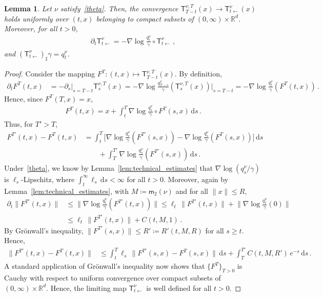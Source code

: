 \documentclass[12pt]{article}
\newcommand{\RR}{\mathbb{R}}
\newcommand{\R}{\RR}
\newcommand{\1}{\mathds{1}}
\newcommand*{\rd}{\mathrm{d}}
\newcommand*{\dd}{\, \rd}
\newcommand{\deq}{\coloneqq}
\renewcommand{\ge}{\geqslant}
\renewcommand{\le}{\leqslant}
\newcommand{\KM}{\mathsf T}
\newcommand{\mom}{\mathsf m_2}
\theoremstyle{plain}
\newtheorem{lemma}[theorem]{Lemma}
\theoremstyle{definition}
\theoremstyle{remark}
\begin{document}
\begin{lemma}\label{lem:km_regular_case}
    Let $\nu$ satisfy~\eqref{theta}.
    Then, the convergence $\KM^{\nu,T}_{T-t}(x) \to \KM^\nu_{t\gets}(x)$ holds uniformly over $(t,x)$ belonging to compact subsets of $(0,\infty)\times \R^d$.
    Moreover, for all $t > 0$,
    \begin{align}\label{eq:deriv_km_map}
        \partial_t \KM^\nu_{t\gets} = -\nabla \log \frac{q_t^\nu}{\gamma}\circ \KM^\nu_{t\gets}\,,
    \end{align}
    and $(\KM^\nu_{t\gets})_\sharp \gamma = q_t^\nu$.
\end{lemma}
\begin{proof}
    Consider the mapping $F^T : (t,x) \mapsto \KM^{\nu,T}_{T-t}(x)$.
    By definition,
    \begin{align*}
        \partial_t F^T(t,x)
        &= -\partial_s\big|_{s=T-t} \KM^{\nu,T}_s(x)
        = -\nabla \log \frac{q^\nu_{T-s}}{\gamma}(\KM^{\nu,T}_s(x))\Big|_{s=T-t}
        = -\nabla \log \frac{q^\nu_t}{\gamma}(F^T(t,x))\,.
    \end{align*}
    Hence, since $F^T(T,x) = x$,
    \begin{align}\label{eq:F_int_eq}
        F^T(t,x) = x + \int_t^T \nabla \log \frac{q_s^\nu}{\gamma}\circ F^T(s,x)\dd s\,.
    \end{align}
    Thus, for $T' > T$,
    \begin{align*}
        F^{T'}(t,x) - F^T(t,x)
        &= \int_t^T \bigl[\nabla \log \frac{q_s^\nu}{\gamma}(F^{T'}(s,x))-\nabla \log \frac{q_s^\nu}{\gamma}(F^{T}(s,x))\bigr]\dd s \\
        &\qquad{} + \int_T^{T'} \nabla \log\frac{q_s^\nu}{\gamma}(F^{T'}(s,x))\dd s\,.
    \end{align*}
    Under~\eqref{theta}, we know by Lemma~\ref{lem:technical_estimates} that $\nabla \log (q_s^\nu/\gamma)$ is $\ell_s$-Lipschitz, where $\int_t^\infty \ell_s\dd s < \infty$ for all $t > 0$.
    Moreover, again by Lemma~\ref{lem:technical_estimates}, with $M \deq \mom(\nu)$ and for all $\|x\|\le R$,
    \begin{align*}
        \partial_t \|F^{T'}(t,x)\|
        &\le \bigl\lVert \nabla \log \frac{q_t^\nu}{\gamma}(F^{T'}(t,x))\bigr\rVert
        \le \ell_t\,\|F^{T'}(t,x)\| + \bigl\lVert \nabla \log \frac{q_t^\nu}{\gamma}(0)\bigr\rVert \\
        &\le \ell_t\,\|F^{T'}(t,x)\| + C(t,M,1)\,.
    \end{align*}
    By Gr\"onwall's inequality, $\|F^{T'}(s,x)\| \le R' \deq R'(t,M,R)$ for all $s\ge t$.
    Hence,
    \begin{align*}
        \|F^{T'}(t,x) - F^T(t,x)\|
        &\le \int_t^T \ell_s\,\|F^{T'}(s,x) - F^T(s,x)\|\dd s + \int_T^{T'} C(t,M,R')\,e^{-s}\dd s\,.
    \end{align*}
    A standard application of Gr\"onwall's inequality now shows that $\{F^T\}_{T> 0}$ is Cauchy with respect to uniform convergence over compact subsets of $(0,\infty) \times \R^d$.
    Hence, the limiting map $\KM^\nu_{t\gets}$ is well defined for all $t > 0$.


\end{proof}
\end{document}
